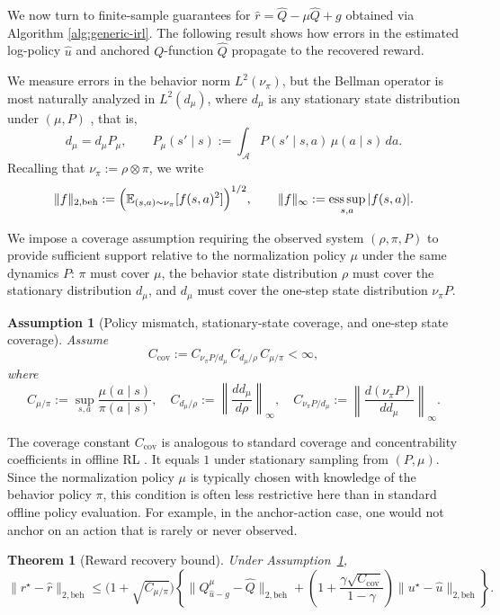 \documentclass{article}
\newtheorem{theorem}{Theorem}
\newtheorem{assumption}{Assumption}
\newcommand{\E}{\mathbb{E}}
\newcommand{\1}{\mathbbm{1}}
\begin{document}
We now turn to finite-sample guarantees for $\hat r = \hat Q -\mu \hat Q + g$ obtained via Algorithm \ref{alg:generic-irl}. The following result shows how errors
in the estimated log-policy \(\hat u\) and anchored \(Q\)-function \(\hat Q\)
propagate to the recovered reward.

We measure errors in the behavior norm \(L^2(\nu_\pi)\), but the Bellman
operator is most naturally analyzed in \(L^2(d_\mu)\), where \(d_\mu\) is any
stationary state distribution under \((\mu,P)\)
\citep{patterson2022generalized,van2025fitted}, that is,
\[
d_\mu = d_\mu P_\mu,
\qquad
P_\mu(s' \mid s) := \int_{\mathcal A} P(s' \mid s,a)\,\mu(a\mid s)\,da.
\]
Recalling that \(\nu_\pi := \rho \otimes \pi\), we write
\[
\|f\|_{2,\mathrm{beh}}
:=
\Bigl(\E_{(s,a)\sim \nu_\pi}[f(s,a)^2]\Bigr)^{1/2},
\qquad
\|f\|_\infty
:=
\operatorname*{ess\,sup}_{s,a} |f(s,a)|.
\]


We impose a coverage assumption requiring the observed system
\((\rho,\pi,P)\) to provide sufficient support relative to the normalization
policy \(\mu\) under the same dynamics \(P\): \(\pi\) must cover \(\mu\), the
behavior state distribution \(\rho\) must cover the stationary distribution
\(d_\mu\), and \(d_\mu\) must cover the one-step state distribution
\(\nu_\pi P\).
 
\begin{assumption}[Policy mismatch, stationary-state coverage, and one-step state coverage]
\label{cond::coverage}
Assume
\[
C_{\mathrm{cov}}
:=
C_{\nu_\pi P/d_\mu}\,C_{d_\mu/\rho}\,C_{\mu/\pi}
< \infty,
\]
where
\[
C_{\mu/\pi}
:=
\sup_{s,a}\frac{\mu(a\mid s)}{\pi(a\mid s)},
\quad
C_{d_\mu/\rho}
:=
\left\|\frac{d d_\mu}{d\rho}\right\|_{\infty},
\quad
C_{\nu_\pi P/d_\mu}
:=
\left\|\frac{d(\nu_\pi P)}{d d_\mu}\right\|_{\infty}.
\]
\end{assumption}
The coverage constant \(C_{\mathrm{cov}}\) is analogous to standard coverage
and concentrability coefficients in offline RL
\citep{xie2022role,zhan2022offline}. It equals \(1\) under stationary sampling
from \((P,\mu)\). Since the normalization policy \(\mu\) is typically chosen
with knowledge of the behavior policy \(\pi\), this condition is often less
restrictive here than in standard offline policy evaluation. For example, in
the anchor-action case, one would not anchor on an action that is rarely or
never observed.


\begin{theorem}[Reward recovery bound]
\label{thm:reward-recovery}
Under Assumption~\ref{cond::coverage},
\[
\|r^\star-\hat r\|_{2,\mathrm{beh}}
\le
\bigl(1+\sqrt{C_{\mu/\pi}}\bigr)
\left\{
\|Q^\mu_{\hat u-g}-\hat Q\|_{2,\mathrm{beh}}
+
\left(
1+\frac{\gamma\sqrt{C_{\mathrm{cov}}}}{1-\gamma}
\right)
\|u^\star-\hat u\|_{2,\mathrm{beh}}
\right\}.
\]
\end{theorem}
 
\end{document}
